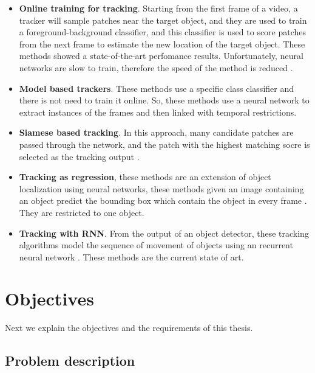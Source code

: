 \documentclass[12pt, a4paper, titlepage,twoside,openright]{article}
\begin{document}
\begin{itemize}


\item \textbf{Online training for tracking}. Starting from the first frame of a video, a tracker will sample patches near the target object, and they are used to train a foreground-background  classifier, and this classifier is used to score patches from the next frame to estimate the new location of the target object. These methods showed a state-of-the-art perfomance results. Unfortunately, neural networks are slow to train, therefore the speed of the method is reduced \cite{deep1} \cite{deep2}.

\item \textbf{Model based trackers}. These methods use a specific class classifier and there is not need to train it online. So, these methods use a neural network to extract instances of the frames and then linked with temporal restrictions. 


\item \textbf{Siamese based tracking}. In this approach, many candidate patches are passed through the network, and the patch with the highest matching socre is selected as the tracking output \cite{trackingSiamese}.


\item \textbf{Tracking as regression}, these methods are an extension of object localization using neural networks, these methods given an image containing an object predict the bounding box which contain the object in every frame \cite{thrun}. They are restricted to one object.


\item \textbf{Tracking with RNN}. From the output of an object detector, these tracking algorithms model the sequence of movement of objects using an recurrent neural network \cite{savaresee}. These methods are the current state of art.


\end{itemize}



\section{Objectives}


Next we explain the objectives and the requirements of this thesis.


\subsection{Problem description}
\end{document}
